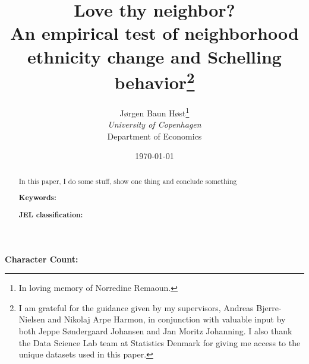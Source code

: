 \documentclass[11pt,a4paper]{article}
\author {
        Jørgen Baun Høst\thanks{In loving memory of Norredine Remaoun.}\\
        \small \textit{University of Copenhagen} \\
        \small Department of Economics}
\title{Love thy neighbor?\\
\vspace{0.35cm}
\Large An empirical test of neighborhood ethnicity change and Schelling behavior\thanks{I am grateful for the guidance given by my supervisors, Andreas Bjerre-Nielsen and Nikolaj Arpe Harmon, in conjunction with valuable input by both Jeppe Søndergaard Johansen and Jan Moritz Johanning. I also thank the Data Science Lab team at Statistics Denmark for giving me access to the unique datasets used in this paper.}
\vspace{0.35cm}
}
\date{\today}
\begin{document}
\begin{spacing}{1}
\maketitle    
\end{spacing}

\vspace*{-1cm}
\begin{abstract}
\noindent
In this paper, I do some stuff, show one thing and conclude something

\medskip
\noindent
\textbf{Keywords:}

\medskip
\noindent
\textbf{JEL classification:} 
\end{abstract}


\newpage 
\begingroup
\begin{spacing}{1.25}
\tableofcontents
\end{spacing}
\endgroup


\vspace{1.5cm}
\begin{center}
\textbf{Character Count:} 
\end{center}

\pagebreak


\pagebreak

 

\pagebreak

 

\pagebreak

 

\pagebreak

 

\pagebreak



\pagebreak
\begin{spacing}{1.25}
    \printbibliography
\end{spacing}

\pagebreak


\appendix
\appendixpage


\end{document}

